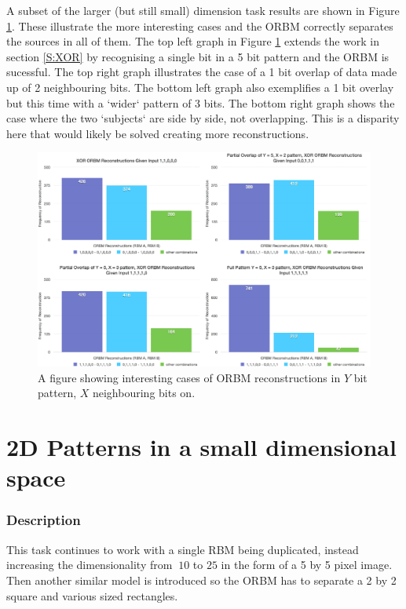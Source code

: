 A subset of the larger (but still small) dimension task results are shown in Figure \ref{F:X-Bit-ORBM-Inference-Results-1}. These illustrate the more interesting cases and the ORBM correctly separates the sources in all of them. The top left graph in Figure \ref{F:X-Bit-ORBM-Inference-Results-1} extends the work in section \ref{S:XOR} by recognising a single bit in a 5 bit pattern and the ORBM is sucessful. The top right graph illustrates the case of a 1 bit overlap of data made up of 2 neighbouring bits. The bottom left graph also exemplifies a 1 bit overlay but this time with a `wider` pattern of 3 bits. The bottom right graph shows the case where the two `subjects` are side by side, not overlapping. This is a disparity here that would likely be solved creating more reconstructions.


\begin{landscape}
\begin{figure}
  \begin{center}
    \includegraphics[height=0.9\textheight]{Assets/results/xy-bit-results}
  \end{center}
  \caption{A figure showing interesting cases of ORBM reconstructions in $Y$ bit pattern, $X$ neighbouring bits on.}

  \label{F:X-Bit-ORBM-Inference-Results-1}
\end{figure}
\end{landscape}

\section{2D Patterns in a small dimensional space}%

\subsubsection{Description}
This task continues to work with a single RBM being duplicated, instead increasing the dimensionality from $~10$ to $25$ in the form of a 5 by 5 pixel image. Then another similar model is introduced so the ORBM has to separate a 2 by 2 square and various sized rectangles.

